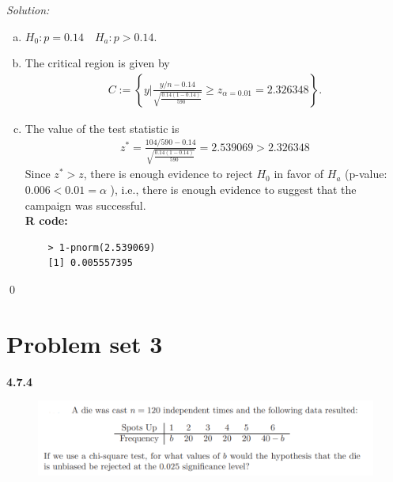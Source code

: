 \documentclass{book}
\theoremstyle{definition}
\newcommand{\al}{\alpha}
\newcommand{\f}[2]{\frac{#1}{#2}}
\newcommand{\lc}{\left\{}
\newcommand{\rc}{\right\}}
\begin{document}
\noindent \textit{Solution:}
\begin{enumerate}[(a)]
	\item $H_0: p = 0.14 \quad H_a : p > 0.14$.
	\item The critical region is given by
	\begin{align}
	C := \lc y \bigg\vert \f{y/n - 0.14}{\sqrt{\f{0.14(1-0.14)}{590}}} \geq z_{\al =  0.01} =  2.326348 \rc.
	\end{align}
	\item The value of the test statistic is
	\begin{align}
	z^* = \f{104/590 - 0.14}{\sqrt{\f{0.14(1-0.14)}{590}}} = \boxed{2.539069 > 2.326348}
	\end{align}
	Since $z^* > z$, there is enough evidence to reject $H_0$ in favor of $H_a$ (p-value: $\boxed{0.006 < 0.01 = \al}$ ), i.e., there is enough evidence to suggest that the campaign was successful.\\
	
	\noindent \textbf{R code:}
	\begin{lstlisting}
	> 1-pnorm(2.539069)
	[1] 0.005557395
	\end{lstlisting}
\end{enumerate}\qed




\newpage










\section{Problem set 3}







\noindent \textbf{4.7.4}
\begin{figure}[!htb]
	\centering
	\includegraphics[scale=0.5]{474}
\end{figure}
\end{document}
